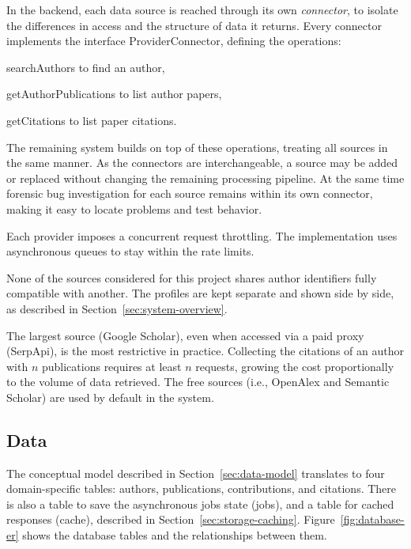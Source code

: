 In the backend, each data source is reached through its own \emph{connector}, to isolate the differences in access and the structure of data it returns.
Every connector implements the interface \textsf{ProviderConnector}, defining the operations:

\begin{description}
    \item \textsf{searchAuthors} to find an author,
    \item \textsf{getAuthorPublications} to list author papers,
    \item \textsf{getCitations} to list paper citations.
\end{description}

The remaining system builds on top of these operations, treating all sources in the same manner.
As the connectors are interchangeable, a source may be added or replaced without changing the remaining processing pipeline.
At the same time forensic bug investigation for each source remains within its own connector, making it easy to locate problems and test behavior.

Each provider imposes a concurrent request throttling.
The implementation uses asynchronous queues to stay within the rate limits.

None of the sources considered for this project shares author identifiers fully compatible with another.
The profiles are kept separate and shown side by side, as described in Section~\ref{sec:system-overview}.

The largest source (\textsf{Google Scholar}), even when accessed via a paid proxy (\textsf{SerpApi}), is the most restrictive in practice.
Collecting the citations of an author with $n$ publications requires at least $n$ requests, growing the cost proportionally to the volume of data retrieved.
The free sources (i.e., \textsf{OpenAlex} and \textsf{Semantic Scholar}) are used by default in the system.

\subsection{Data} \label{sec:data}

The conceptual model described in Section~\ref{sec:data-model} translates to four domain-specific tables: \textsf{authors}, \textsf{publications}, \textsf{contributions}, and \textsf{citations}.
There is also a table to save the asynchronous jobs state (\textsf{jobs}), and a table for cached responses (\textsf{cache}), described in Section~\ref{sec:storage-caching}. 
Figure~\ref{fig:database-er} shows the database tables and the relationships between them.

